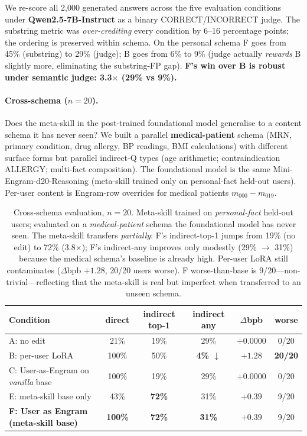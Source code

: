 \documentclass{article}
\begin{document}
We re-score all 2{,}000 generated answers across the five evaluation
conditions under \textbf{Qwen2.5-7B-Instruct} as a binary
CORRECT/INCORRECT judge. The substring metric was
\emph{over-crediting} every condition by 6--16 percentage points; the
ordering is preserved within schema. On the personal schema F
goes from 45\% (substring) to 29\% (judge); B goes from 6\% to 9\%
(judge actually \emph{rewards} B slightly more, eliminating the
substring-FP gap). \textbf{F's win over B is robust under semantic
judge: 3.3$\times$ (29\% vs 9\%).}

\paragraph{Cross-schema ($n{=}20$).}
Does the meta-skill in the post-trained foundational model generalise
to a content schema it has never seen? We built a parallel
\textbf{medical-patient} schema (MRN, primary condition, drug
allergy, BP readings, BMI calculations) with different surface forms
but parallel indirect-Q types (age arithmetic; contraindication
ALLERGY; multi-fact composition). The foundational model is the same
Mini-Engram-d20-Reasoning (meta-skill trained only on personal-fact
held-out users). Per-user content is Engram-row overrides for
medical patients $m_{000}\!-\!m_{019}$.

\begin{table}[t]
  \centering
  \caption{Cross-schema evaluation, $n{=}20$. Meta-skill trained on
  \emph{personal-fact} held-out users; evaluated on a
  \emph{medical-patient} schema the foundational model has never seen.
  The meta-skill transfers \emph{partially}: F's indirect-top-1 jumps
  from 19\% (no edit) to 72\% (3.8$\times$); F's indirect-any
  improves only modestly (29\% $\to$ 31\%) because the medical schema's
  baseline is already high. Per-user LoRA still contaminates
  ($\Delta$bpb $+1.28$, 20/20 users worse). F worse-than-base is
  9/20—non-trivial—reflecting that the meta-skill is real but
  imperfect when transferred to an unseen schema.}
  \label{tab:cross-schema}
  \begin{tabular}{lccccc}
    \toprule
    Condition & direct & indirect top-1 & indirect any & $\Delta$bpb & worse \\
    \midrule
    A: no edit                                  & 21\% & 19\% & 29\% & $+0.0000$ & 0/20 \\
    B: per-user LoRA                            & 100\% & 50\% & \textbf{4\% $\downarrow$} & $+1.28$ & \textbf{20/20} \\
    C: User-as-Engram on \emph{vanilla} base    & 100\% & 19\% & 29\% & $+0.0000$ & 0/20 \\
    E: meta-skill base only                     & 43\% & \textbf{72\%} & 31\% & $+0.39$ & 9/20 \\
    \textbf{F: User as Engram (meta-skill base)} & \textbf{100\%} & \textbf{72\%} & \textbf{31\%} & \textbf{$+0.39$} & 9/20 \\
    \bottomrule
  \end{tabular}
\end{table}
\end{document}
